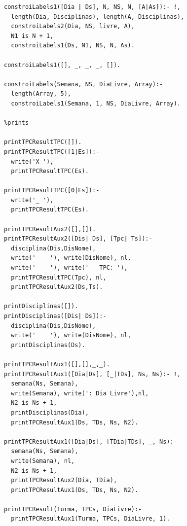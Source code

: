 \documentclass{llncs}
\newenvironment{changemargin}[2]{%
\begin{list}{}{%
\setlength{\topsep}{0pt}%
\setlength{\leftmargin}{#1}%
\setlength{\rightmargin}{#2}%
\setlength{\listparindent}{\parindent}%
\setlength{\itemindent}{\parindent}%
\setlength{\parsep}{\parskip}%
}%
\item[]}{
\end{list}}
\begin{document}
\begin{changemargin}{-3cm}{-4cm}
\begin{verbatim}
constroiLabels1([Dia | Ds], N, NS, N, [A|As]):- !,
  length(Dia, Disciplinas), length(A, Disciplinas),
  constroiLabels2(Dia, NS, livre, A),
  N1 is N + 1,
  constroiLabels1(Ds, N1, NS, N, As).

constroiLabels1([], _, _, _, []).

constroiLabels(Semana, NS, DiaLivre, Array):-
  length(Array, 5),
  constroiLabels1(Semana, 1, NS, DiaLivre, Array).

%prints

printTPCResultTPC([]).
printTPCResultTPC([1|Es]):-
  write('X '),
  printTPCResultTPC(Es).

printTPCResultTPC([0|Es]):-
  write('_ '),
  printTPCResultTPC(Es).

printTPCResultAux2([],[]).
printTPCResultAux2([Dis| Ds], [Tpc| Ts]):-
  disciplina(Dis,DisNome),
  write('    '), write(DisNome), nl,
  write('    '), write('   TPC: '),
  printTPCResultTPC(Tpc), nl,
  printTPCResultAux2(Ds,Ts).

printDisciplinas([]).
printDisciplinas([Dis| Ds]):-
  disciplina(Dis,DisNome),
  write('    '), write(DisNome), nl,
  printDisciplinas(Ds).

printTPCResultAux1([],[],_,_).
printTPCResultAux1([Dia|Ds], [_|TDs], Ns, Ns):- !,
  semana(Ns, Semana),
  write(Semana), write(': Dia Livre'),nl,
  N2 is Ns + 1,
  printDisciplinas(Dia),
  printTPCResultAux1(Ds, TDs, Ns, N2).

printTPCResultAux1([Dia|Ds], [TDia|TDs], _, Ns):-
  semana(Ns, Semana),
  write(Semana), nl,
  N2 is Ns + 1,
  printTPCResultAux2(Dia, TDia),
  printTPCResultAux1(Ds, TDs, Ns, N2).

printTPCResult(Turma, TPCs, DiaLivre):-
  printTPCResultAux1(Turma, TPCs, DiaLivre, 1).


\end{verbatim}
\end{changemargin}
\end{document}
